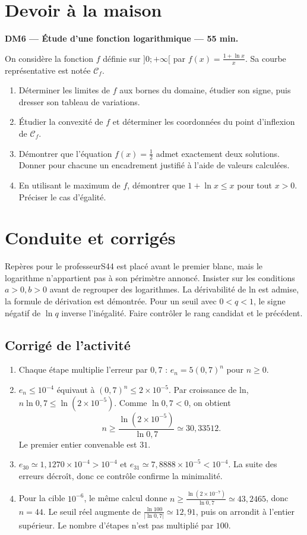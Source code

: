 \section{Devoir à la maison}\textbf{DM6 --- Étude d'une fonction logarithmique --- 55 min.}\par On considère la fonction $f$ définie sur $]0;+\infty[$ par $f(x)=\frac{1+\ln x}{x}$. Sa courbe représentative est notée $\mathcal C_f$.
\begin{enumerate}\item Déterminer les limites de $f$ aux bornes du domaine, étudier son signe, puis dresser son tableau de variations.
\item Étudier la convexité de $f$ et déterminer les coordonnées du point d'inflexion de $\mathcal C_f$.
\item Démontrer que l'équation $f(x)=\frac12$ admet exactement deux solutions. Donner pour chacune un encadrement justifié à l'aide de valeurs calculées.
\item En utilisant le maximum de $f$, démontrer que $1+\ln x\le x$ pour tout $x>0$. Préciser le cas d'égalité.\end{enumerate}

\ifprof\clearpage\section{Conduite et corrigés}\begin{profbox}{Repères pour le professeur}S44 est placé avant le premier blanc, mais le logarithme n'appartient pas à son périmètre annoncé. Insister sur les conditions $a>0,b>0$ avant de regrouper des logarithmes. La dérivabilité de ln est admise, la formule de dérivation est démontrée. Pour un seuil avec $0<q<1$, le signe négatif de $\ln q$ inverse l'inégalité. Faire contrôler le rang candidat et le précédent.\end{profbox}

\subsection{Corrigé de l'activité}\begin{enumerate}
\item Chaque étape multiplie l'erreur par $0{,}7$ : $e_n=5(0{,}7)^n$ pour $n\ge0$.
\item $e_n\le10^{-4}$ équivaut à $(0{,}7)^n\le2\times10^{-5}$. Par croissance de ln, $n\ln0{,}7\le\ln(2\times10^{-5})$. Comme $\ln0{,}7<0$, on obtient
\[n\ge\frac{\ln(2\times10^{-5})}{\ln0{,}7}\simeq30{,}33512.\]
Le premier entier convenable est $31$.
\item $e_{30}\simeq1{,}1270\times10^{-4}>10^{-4}$ et $e_{31}\simeq7{,}8888\times10^{-5}<10^{-4}$. La suite des erreurs décroît, donc ce contrôle confirme la minimalité.
\item Pour la cible $10^{-6}$, le même calcul donne $n\ge\frac{\ln (2\times10^{-7})}{\ln 0{,}7}\simeq43{,}2465$, donc $n=44$. Le seuil réel augmente de $\frac{\ln 100}{|\ln0{,}7|}\simeq12{,}91$, puis on arrondit à l'entier supérieur. Le nombre d'étapes n'est pas multiplié par $100$.
\end{enumerate}

